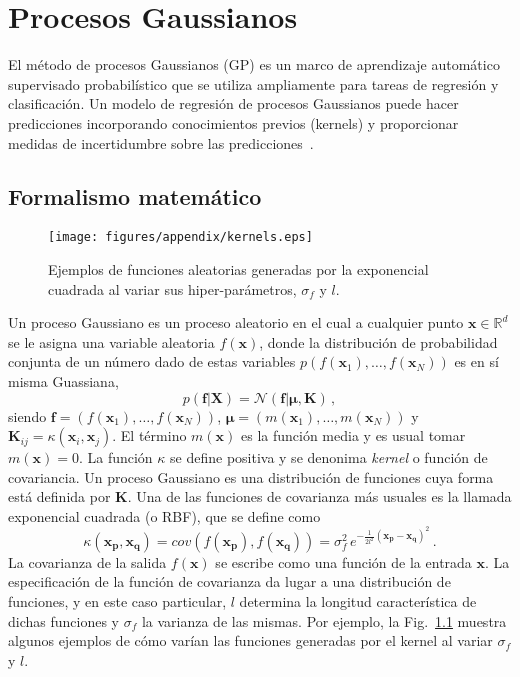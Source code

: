 \chapter{Procesos Gaussianos}
\label{app:gp}

El método de procesos Gaussianos (GP) es un marco de aprendizaje 
automático supervisado probabilístico que se utiliza ampliamente 
para tareas de regresión y clasificación. Un modelo de regresión de 
procesos Gaussianos puede hacer predicciones incorporando conocimientos 
previos (kernels) y proporcionar medidas de incertidumbre sobre las 
predicciones~\cite{Rasmussen:06}. 

\section*{Formalismo matemático}

\begin{figure}
\centering
\texttt{[image: figures/appendix/kernels.eps]}
\caption{Ejemplos de funciones aleatorias generadas por la exponencial 
cuadrada al variar sus hiper-parámetros, $\sigma_f$ y $l$.}
\label{fig:kernels}
\end{figure}

Un proceso Gaussiano es un proceso aleatorio en el cual a cualquier 
punto $\mathbf{x}\in \mathbb{R}^d$ se le asigna una variable aleatoria 
$f(\mathbf{x})$, donde la distribución de probabilidad conjunta de un 
número dado de estas variables 
$p(f(\mathbf{x}_1),\dots,f(\mathbf{x}_N))$ es en sí misma Guassiana,
\begin{equation}
p(\mathbf{f}|\mathbf{X})
=\mathcal{N}(\mathbf{f}|\boldsymbol{\mu},\mathbf{K})\,,
\end{equation}
siendo $\mathbf{f}=(f(\mathbf{x}_1),\dots,f(\mathbf{x}_N))$, 
$\boldsymbol\mu=(m(\mathbf{x}_1),\dots,m(\mathbf{x}_N))$ y 
$\mathbf{K}_{ij}=\kappa(\mathbf{x}_i,\mathbf{x}_j)$. El término 
$m(\mathbf{x})$ es la función media y es usual tomar $m(\mathbf{x})=0$.
La función $\kappa$ se define positiva y se denonima \textit{kernel}
o función de covariancia. Un proceso Gaussiano es una distribución de 
funciones cuya forma está definida por $\mathbf{K}$. Una de las 
funciones de covarianza más usuales es la llamada exponencial
cuadrada (o RBF), que se define como
\begin{equation}
\kappa(\mathbf{x}_{\mathbf{p}},\mathbf{x}_{\mathbf{q}})
=cov(f(\mathbf{x}_{\mathbf{p}}),f(\mathbf{x}_{\mathbf{q}}))
=\sigma_f^2\,e^{-\frac{1}{2l^2}(\mathbf{x}_{\mathbf{p}}
-\mathbf{x}_{\mathbf{q}})^2}\,.
\end{equation}
La covarianza de la salida $f(\mathbf{x})$ se escribe como una función 
de la entrada $\mathbf{x}$. La especificación de la función de 
covarianza da lugar a una distribución de funciones, y en este caso 
particular, $l$ determina la longitud característica de dichas funciones
y $\sigma_f$ la varianza de las mismas. Por ejemplo, la 
Fig.~\ref{fig:kernels} muestra algunos ejemplos de cómo varían las 
funciones generadas por el kernel al variar $\sigma_f$ y $l$.

